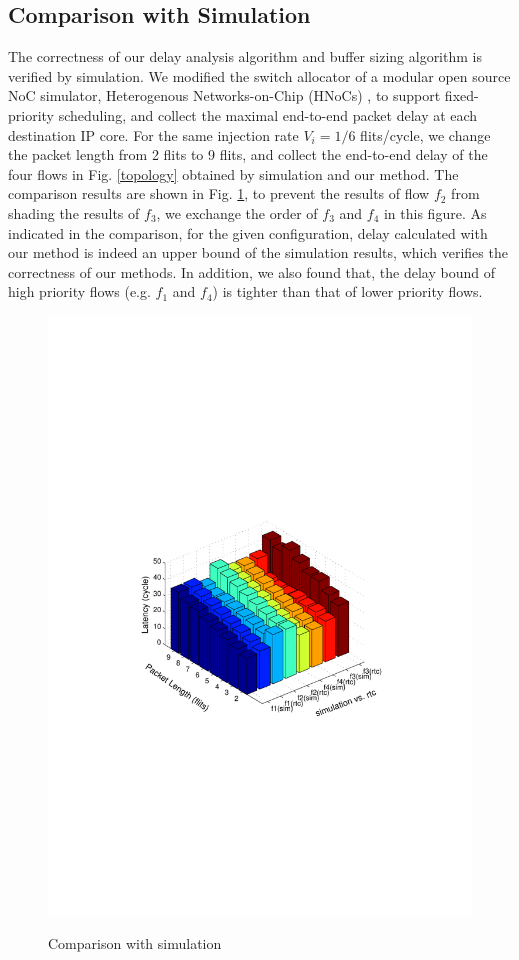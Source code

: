 \documentclass[10pt,journal]{IEEEtran}
\begin{document}
\subsection{Comparison with Simulation}
The correctness of our delay analysis algorithm and buffer sizing algorithm is verified by simulation. We modified the switch allocator of a modular open source NoC simulator, Heterogenous Networks-on-Chip (HNoCs) \cite{6404157}, to support fixed-priority scheduling, and collect the maximal end-to-end packet delay at each destination IP core. For the same injection rate $V_i=1/6$ flits/cycle, we change the packet length from 2 flits to 9 flits, and collect the end-to-end delay of the four flows in Fig. \ref{topology} obtained by simulation and our method. The comparison results are shown in Fig. \ref{rtcvssim}, to prevent the results of flow $f_2$ from shading the results of $f_3$, we exchange the order of $f_3$ and $f_4$ in this figure. As indicated in the comparison, for the given configuration, delay calculated with our method is indeed an upper bound of the simulation results, which verifies the correctness of our methods. In addition, we also found that, the delay bound of high priority flows (e.g. $f_1$ and $f_4$) is tighter than that of lower priority flows.
\begin{figure}
  \centering
  \includegraphics[scale=0.65]{figures/rtcvssim.pdf}\\
  \caption{Comparison with simulation}\label{rtcvssim}
\end{figure}
\end{document}
